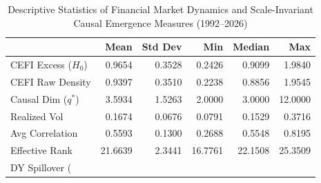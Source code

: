 \begin{table}
\caption{Descriptive Statistics of Financial Market Dynamics and Scale-Invariant Causal Emergence Measures (1992--2026)}
\label{tab:desc_stats}
\begin{tabular}{lrrrrr}
\toprule
 & Mean & Std Dev & Min & Median & Max \\
\midrule
CEFI Excess ($H_0$) & 0.9654 & 0.3528 & 0.2426 & 0.9099 & 1.9840 \\
CEFI Raw Density & 0.9397 & 0.3510 & 0.2238 & 0.8856 & 1.9545 \\
Causal Dim ($q^*$) & 3.5934 & 1.5263 & 2.0000 & 3.0000 & 12.0000 \\
Realized Vol & 0.1674 & 0.0676 & 0.0791 & 0.1529 & 0.3716 \\
Avg Correlation & 0.5593 & 0.1300 & 0.2688 & 0.5548 & 0.8195 \\
Effective Rank & 21.6639 & 2.3441 & 16.7761 & 22.1508 & 25.3509 \\
DY Spillover (%
\bottomrule
\end{tabular}
\end{table}
